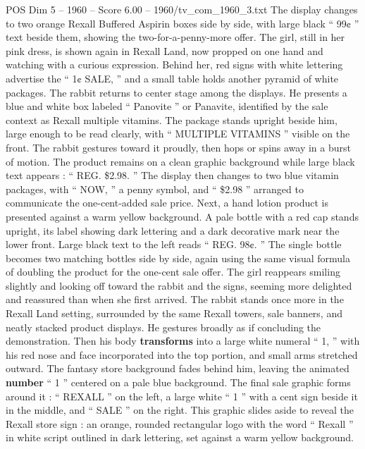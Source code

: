 \begin{textsample}{POS Dim 5 – 1960 – Score 6.00 – 1960/tv\_com\_1960\_3.txt}
The display changes to two orange Rexall Buffered Aspirin boxes side by side, with large black “ 99¢ ” text beside them, showing the two-for-a-penny-more offer.
The girl, still in her pink dress, is shown again in Rexall Land, now propped on one hand and watching with a curious expression.
Behind her, red signs with white lettering advertise the “ 1¢ SALE, ” and a small table holds another pyramid of white packages.
The rabbit returns to center stage among the displays.
He presents a blue and white box labeled “ Panovite ” or Panavite, identified by the sale context as Rexall multiple vitamins.
The package stands upright beside him, large enough to be read clearly, with “ MULTIPLE VITAMINS ” visible on the front.
The rabbit gestures toward it proudly, then hops or spins away in a burst of motion.
The product remains on a clean graphic background while large black text appears : “ REG. \$2.98. ” The display then changes to two blue vitamin packages, with “ NOW, ” a penny symbol, and “ \$2.98 ” arranged to communicate the one-cent-added sale price.
Next, a hand lotion product is presented against a warm yellow background.
A pale bottle with a red cap stands upright, its label showing dark lettering and a dark decorative mark near the lower front.
Large black text to the left reads “ REG. 98¢. ” The single bottle becomes two matching bottles side by side, again using the same visual formula of doubling the product for the one-cent sale offer.
The girl reappears smiling slightly and looking off toward the rabbit and the signs, seeming more delighted and reassured than when she first arrived.
The rabbit stands once more in the Rexall Land setting, surrounded by the same Rexall towers, sale banners, and neatly stacked product displays.
He gestures broadly as if concluding the demonstration.
Then his body \textbf{transforms} into a large white numeral “ 1, ” with his red nose and face incorporated into the top portion, and small arms stretched outward.
The fantasy store background fades behind him, leaving the animated \textbf{number} “ 1 ” centered on a pale blue background.
The final sale graphic forms around it : “ REXALL ” on the left, a large white “ 1 ” with a cent sign beside it in the middle, and “ SALE ” on the right.
This graphic slides aside to reveal the Rexall store sign : an orange, rounded rectangular logo with the word “ Rexall ” in white script outlined in dark lettering, set against a warm yellow background.

\end{textsample}
